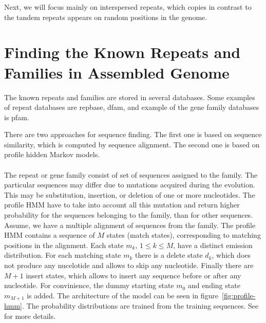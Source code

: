 Next, we will focus mainly on interspersed repeats, which copies in contrast to the tandem repeats appears on random positions in the genome.

\section{Finding the Known Repeats and Families in Assembled Genome}

The known repeats and families are stored in several databases. Some examples of repeat databases are repbase\cite{repbase}, dfam\cite{dfam}, and example of the gene family databases is pfam\cite{pfam}.

There are two approaches for sequence finding. The first one is based on sequence similarity, which is computed by sequence alignment. The second one is based on profile hidden Markov models.

\paragraph{}

\paragraph{}
The repeat or gene family consist of set of sequences assigned to the family. The particular sequences may differ due to mutations acquired during the evolution. This may be substitution, insertion, or deletion of one or more nucleotides. The profile HMM have to take into account all this mutation and return higher probability for the sequences belonging to the family, than for other sequences.
Assume, we have a multiple alignment of sequences from the family. The profile HMM\cite{profile-hmm} contains a sequence of $M$ states (match states), corresponding to matching positions in the alignment. Each state $m_k,\, 1 \leq k \leq M$, have a distinct emission distribution.
For each matching state $m_k$ there is a delete state $d_k$, which does not produce any nucelotide and allows to skip any nucleotide. Finally there are $M+1$ insert states, which allows to insert any sequence before or after any nucleotide. For convinience, the dummy starting state $m_0$ and ending state $m_{M+1}$ is added.
The architecture of the model can be seen in figure~\ref{fig:profile-hmm}. The probability distributions are trained from the training sequences. See~\cite{profile-hmm} for more details.

